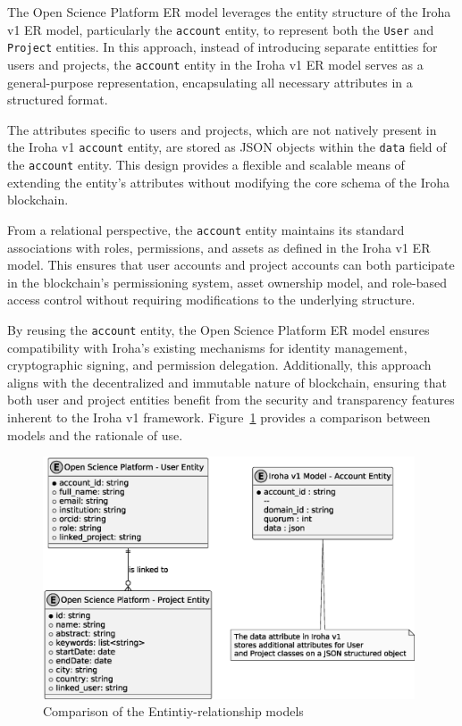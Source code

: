 \documentclass{article}
\begin{document}
The Open Science Platform ER model leverages the entity structure of the Iroha v1 ER model, particularly the \texttt{account} entity, to represent both the \texttt{User} and \texttt{Project} entities. In this approach, instead of introducing separate entitties for users and projects, the \texttt{account} entity in the Iroha v1 ER model serves as a general-purpose representation, encapsulating all necessary attributes in a structured format.

The attributes specific to users and projects, which are not natively present in the Iroha v1 \texttt{account} entity, are stored as JSON objects within the \texttt{data} field of the \texttt{account} entity. This design provides a flexible and scalable means of extending the entity's attributes without modifying the core schema of the Iroha blockchain.

From a relational perspective, the \texttt{account} entity maintains its standard associations with roles, permissions, and assets as defined in the Iroha v1 ER model. This ensures that user accounts and project accounts can both participate in the blockchain's permissioning system, asset ownership model, and role-based access control without requiring modifications to the underlying structure.

By reusing the \texttt{account} entity, the Open Science Platform ER model ensures compatibility with Iroha's existing mechanisms for identity management, cryptographic signing, and permission delegation. Additionally, this approach aligns with the decentralized and immutable nature of blockchain, ensuring that both user and project entities benefit from the security and transparency features inherent to the Iroha v1 framework. Figure~\ref{fig:comparing_er_models} provides a comparison between models and the rationale of use.



\begin{figure}[htbp]
      \centering
      \includegraphics[width=0.98\textwidth, keepaspectratio]{comparing_er_models.eps}
      \caption{Comparison of the Entintiy-relationship models}
      \label{fig:comparing_er_models}
\end{figure}
\end{document}
